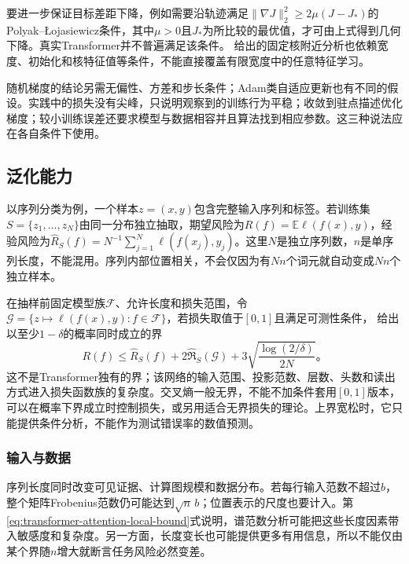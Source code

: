 要进一步保证目标差距下降，例如需要沿轨迹满足$\lVert\nabla J\rVert_2^2\geq2\mu(J-J_*)$的Polyak--Łojasiewicz条件，其中$\mu>0$且$J_*$为所比较的最优值，才可由上式得到几何下降。真实Transformer并不普遍满足该条件。
给出的固定核附近分析也依赖宽度、初始化和核特征值等条件，不能直接覆盖有限宽度中的任意特征学习。

随机梯度的结论另需无偏性、方差和步长条件；Adam类自适应更新也有不同的假设。实践中的损失没有尖峰，只说明观察到的训练行为平稳；收敛到驻点描述优化梯度；较小训练误差还要求模型与数据相容并且算法找到相应参数。这三种说法应在各自条件下使用。

\subsection{泛化能力}
\label{sec:transformer-model-generalization}

以序列分类为例，一个样本$z=(x,y)$包含完整输入序列和标签。若训练集$S=\{z_1,\ldots,z_N\}$由同一分布独立抽取，期望风险为$R(f)=\mathbb E\ell(f(x),y)$，经验风险为$\widehat R_S(f)=N^{-1}\sum_{j=1}^N\ell(f(x_j),y_j)$。这里$N$是独立序列数，$n$是单序列长度，不能混用。序列内部位置相关，不会仅因为有$Nn$个词元就自动变成$Nn$个独立样本。

在抽样前固定模型族$\mathcal F$、允许长度和损失范围，令$\mathcal G=\{z\mapsto\ell(f(x),y):f\in\mathcal F\}$，若损失取值于$[0,1]$且满足可测性条件，
给出以至少$1-\delta$的概率同时成立的界
\begin{equation}
  R(f)\leq\widehat R_S(f)+2\widehat{\mathfrak R}_S(\mathcal G)
       +3\sqrt{\frac{\log(2/\delta)}{2N}}\text{。}
  \label{eq:transformer-generalization-bound}
\end{equation}
这不是Transformer独有的界；该网络的输入范围、投影范数、层数、头数和读出方式进入损失函数族的复杂度。交叉熵一般无界，不能不加条件套用$[0,1]$版本，可以在概率下界成立时控制损失，或另用适合无界损失的理论。上界宽松时，它只能提供条件分析，不能作为测试错误率的数值预测。

\subsubsection{输入与数据}

序列长度同时改变可见证据、计算图规模和数据分布。若每行输入范数不超过$b$，整个矩阵Frobenius范数仍可能达到$\sqrt n\,b$；位置表示的尺度也要计入。第\ref{eq:transformer-attention-local-bound}式说明，谱范数分析可能把这些长度因素带入敏感度和复杂度。另一方面，长度变长也可能提供更多有用信息，所以不能仅由某个界随$n$增大就断言任务风险必然变差。

